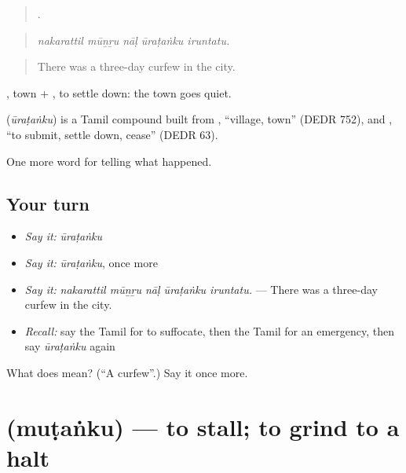 \begin{quote}
    .
\end{quote}

\begin{quote}
\emph{nakarattil mūṉṟu nāḷ ūraṭaṅku iruntatu.}
\end{quote}

\begin{quote}
There was a three-day curfew in the city.
\end{quote}

, town + , to settle down: the town goes quiet.

\begin{cousinweb}
\textbf{} (\emph{ūraṭaṅku}) is a Tamil compound built from , \textquotedblleft{}village, town\textquotedblright{} (DEDR 752), and , \textquotedblleft{}to submit, settle down, cease\textquotedblright{} (DEDR 63).
\end{cousinweb}

\begin{grammarlens}[title={What you've built}]
One more word for telling what happened.
\end{grammarlens}

\subsection*{Your turn}
\begin{itemize}
\raggedright
  \item \emph{Say it:} \emph{ūraṭaṅku}
  \item \emph{Say it:} \emph{ūraṭaṅku}, once more
  \item \emph{Say it:} \emph{nakarattil mūṉṟu nāḷ ūraṭaṅku iruntatu.} — There was a three-day curfew in the city.
  \item \emph{Recall:} say the Tamil for to suffocate, then the Tamil for an emergency, then say \emph{ūraṭaṅku} again
\end{itemize}

\begin{tcolorbox}[breakable,colback=teal!4,colframe=teal!35!black,title={Before you move on}]
What does  mean? (\textquotedblleft{}A curfew\textquotedblright{}.) Say it once more.
\end{tcolorbox}
\section[\texorpdfstring{\ta{முடங்கு} (muṭaṅku)}{முடங்கு (muṭaṅku)}]{ (muṭaṅku) — to stall; to grind to a halt}


